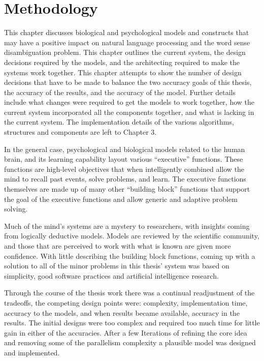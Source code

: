 \chapter{Methodology}

This chapter discusses biological and psychological models and constructs that may have a positive impact on natural language processing and the word sense disambiguation problem.  This chapter outlines the current system, the design decisions required by the models, and the architecting required to make the systems work together.  This chapter attempts to show the number of design decisions that have to be made to balance the two accuracy goals of this thesis, the accuracy of the results, and the accuracy of the model. Further details include what changes were required to get the models to work together, how the current system incorporated all the components together, and what is lacking in the current system.  The implementation details of the various algorithms, structures and components are left to Chapter 3.

In the general case, psychological and biological models related to the human brain, and its learning capability layout various ``executive'' functions.  These functions are high-level objectives that when intelligently combined allow the mind to recall past events, solve problems, and learn. The executive functions themselves are made up of many other ``building block'' functions that support the goal of the executive functions and allow generic and adaptive problem solving.

Much of the mind's systems are a mystery to researchers, with insights coming from logically deductive models.  Models are reviewed by the scientific community, and those that are perceived to work with what is known are given more confidence.  With little describing the building block functions, coming up with a solution to all of the minor problems in this thesis' system was based on simplicity, good software practices and artificial intelligence research.

Through the course of the thesis work there was a continual readjustment of the tradeoffs, the competing design points were: complexity, implementation time, accuracy to the models, and when results became available, accuracy in the results.  The initial designs were too complex and required too much time for little gain in either of the accuracies.  After a few Iterations of refining the core idea and removing some of the parallelism complexity a plausible model was designed and implemented.


